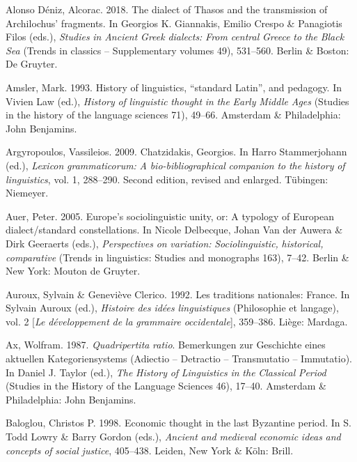 \documentclass[output=paper]{langsci/langscibook}
\begin{document}
Alonso Déniz, Alcorac. 2018. The dialect of Thasos and the transmission of Archilochus’ fragments. In Georgios K. Giannakis, Emilio Crespo \& Panagiotis Filos (eds.), \textit{Studies} \textit{in} \textit{Ancient} \textit{Greek} \textit{dialects:} \textit{From} \textit{central} \textit{Greece} \textit{to} \textit{the} \textit{Black} \textit{Sea} (Trends in classics – Supplementary volumes 49), 531–560. Berlin \& Boston: De Gruyter.

Amsler, Mark. 1993. History of linguistics, “standard Latin”, and pedagogy. In Vivien Law (ed.), \textit{History} \textit{of} \textit{linguistic} \textit{thought} \textit{in} \textit{the} \textit{Early} \textit{Middle} \textit{Ages} (Studies in the history of the language sciences 71), 49–66. Amsterdam \& Philadelphia: John Benjamins.

Argyropoulos, Vassileios. 2009. Chatzidakis, Georgios. In Harro Stammerjohann (ed.), \textit{Lexicon} \textit{grammaticorum:} \textit{A} \textit{bio-bibliographical} \textit{companion} \textit{to} \textit{the} \textit{history} \textit{of} \textit{linguistics}, vol. 1, 288–290. Second edition, revised and enlarged. Tübingen: Niemeyer.

Auer, Peter. 2005. Europe’s sociolinguistic unity, or: A typology of European dialect/standard constellations. In Nicole Delbecque, Johan Van der Auwera \& Dirk Geeraerts (eds.), \textit{Perspectives} \textit{on} \textit{variation:} \textit{Sociolinguistic,} \textit{historical,} \textit{comparative} (Trends in linguistics: Studies and monographs 163), 7–42. Berlin \& New York: Mouton de Gruyter.

Auroux, Sylvain \& Geneviève Clerico. 1992. Les traditions nationales:  France. In Sylvain Auroux (ed.), \textit{Histoire} \textit{des} \textit{idées} \textit{linguistiques} (Philosophie et langage), vol. 2 [\textit{Le} \textit{développement} \textit{de} \textit{la} \textit{grammaire} \textit{occidentale}], 359–386. Liège: Mardaga.

Ax, Wolfram. 1987. \textit{Quadripertita} \textit{ratio}. Bemerkungen zur Geschichte eines aktuellen Kategoriensystems (Adiectio – Detractio – Transmutatio – Immutatio). In Daniel J. Taylor (ed.), \textit{The} \textit{History} \textit{of} \textit{Linguistics} \textit{in} \textit{the} \textit{Classical} \textit{Period} (Studies in the History of the Language Sciences 46), 17–40. Amsterdam \& Philadelphia: John Benjamins.

Baloglou, Christos P. 1998. Economic thought in the last Byzantine period. In S. Todd Lowry \& Barry Gordon (eds.), \textit{Ancient} \textit{and} \textit{medieval} \textit{economic} \textit{ideas} \textit{and} \textit{concepts} \textit{of} \textit{social} \textit{justice}, 405–438. Leiden, New York \& Köln: Brill.
\end{document}
